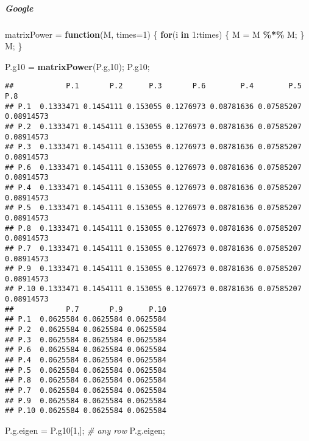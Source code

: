 \documentclass[
]{article}
\newenvironment{Shaded}{\begin{snugshade}}{\end{snugshade}}
\newcommand{\CommentTok}[1]{\textcolor[rgb]{0.56,0.35,0.01}{\textit{#1}}}
\newcommand{\ControlFlowTok}[1]{\textcolor[rgb]{0.13,0.29,0.53}{\textbf{#1}}}
\newcommand{\DataTypeTok}[1]{\textcolor[rgb]{0.13,0.29,0.53}{#1}}
\newcommand{\DecValTok}[1]{\textcolor[rgb]{0.00,0.00,0.81}{#1}}
\newcommand{\KeywordTok}[1]{\textcolor[rgb]{0.13,0.29,0.53}{\textbf{#1}}}
\newcommand{\NormalTok}[1]{#1}
\newcommand{\OperatorTok}[1]{\textcolor[rgb]{0.81,0.36,0.00}{\textbf{#1}}}
\newcommand{\StringTok}[1]{\textcolor[rgb]{0.31,0.60,0.02}{#1}}
\begin{document}
\hypertarget{google}{%
\subparagraph{Google}\label{google}}

\begin{Shaded}
\begin{Highlighting}[]
\NormalTok{matrixPower =}\StringTok{ }\ControlFlowTok{function}\NormalTok{(M, }\DataTypeTok{times=}\DecValTok{1}\NormalTok{)}
\NormalTok{  \{}
  \ControlFlowTok{for}\NormalTok{(i }\ControlFlowTok{in} \DecValTok{1}\OperatorTok{:}\NormalTok{times)}
\NormalTok{    \{}
\NormalTok{    M =}\StringTok{ }\NormalTok{M }\OperatorTok{\%*\%}\StringTok{ }\NormalTok{M;}
\NormalTok{    \}}
\NormalTok{  M;}
\NormalTok{  \}}

\NormalTok{P.g10 =}\StringTok{ }\KeywordTok{matrixPower}\NormalTok{(P.g,}\DecValTok{10}\NormalTok{);}
\NormalTok{P.g10;}
\end{Highlighting}
\end{Shaded}

\begin{verbatim}
##            P.1       P.2      P.3       P.6        P.4        P.5        P.8
## P.1  0.1333471 0.1454111 0.153055 0.1276973 0.08781636 0.07585207 0.08914573
## P.2  0.1333471 0.1454111 0.153055 0.1276973 0.08781636 0.07585207 0.08914573
## P.3  0.1333471 0.1454111 0.153055 0.1276973 0.08781636 0.07585207 0.08914573
## P.6  0.1333471 0.1454111 0.153055 0.1276973 0.08781636 0.07585207 0.08914573
## P.4  0.1333471 0.1454111 0.153055 0.1276973 0.08781636 0.07585207 0.08914573
## P.5  0.1333471 0.1454111 0.153055 0.1276973 0.08781636 0.07585207 0.08914573
## P.8  0.1333471 0.1454111 0.153055 0.1276973 0.08781636 0.07585207 0.08914573
## P.7  0.1333471 0.1454111 0.153055 0.1276973 0.08781636 0.07585207 0.08914573
## P.9  0.1333471 0.1454111 0.153055 0.1276973 0.08781636 0.07585207 0.08914573
## P.10 0.1333471 0.1454111 0.153055 0.1276973 0.08781636 0.07585207 0.08914573
##            P.7       P.9      P.10
## P.1  0.0625584 0.0625584 0.0625584
## P.2  0.0625584 0.0625584 0.0625584
## P.3  0.0625584 0.0625584 0.0625584
## P.6  0.0625584 0.0625584 0.0625584
## P.4  0.0625584 0.0625584 0.0625584
## P.5  0.0625584 0.0625584 0.0625584
## P.8  0.0625584 0.0625584 0.0625584
## P.7  0.0625584 0.0625584 0.0625584
## P.9  0.0625584 0.0625584 0.0625584
## P.10 0.0625584 0.0625584 0.0625584
\end{verbatim}

\begin{Shaded}
\begin{Highlighting}[]
\NormalTok{P.g.eigen =}\StringTok{ }\NormalTok{P.g10[}\DecValTok{1}\NormalTok{,]; }\CommentTok{\# any row}
\NormalTok{P.g.eigen;}
\end{Highlighting}
\end{Shaded}
\end{document}

